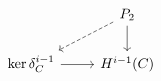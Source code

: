 \documentclass[12pt]{standalone}
\begin{document}
        $$

\begin{tikzcd}
    & P_2 \ar[dl,dashed] \ar[d] \\
    \ker \delta_C^{i-1} \ar[r] & H^{i-1}(C) 
\end{tikzcd}
        $$
        
\end{document}
